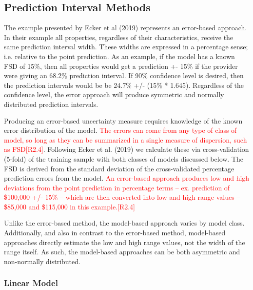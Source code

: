 \documentclass[colTwo]{anon}
\theoremstyle{definition}
\begin{document}
\subsection{Prediction Interval Methods}

The example presented by Ecker et al (2019) represents an error-based approach. In their example all properties, regardless of their characteristics, receive the same prediction interval width.  These widths are expressed in a percentage sense; i.e. relative to the point prediction. As an example,  if the model has a known FSD of 15\%, then all properties would get a prediction +- 15\% if the provider were giving an 68.2\% prediction interval.  If 90\% confidence level is desired, then the prediction intervals would be be 24.7\% +/- (15\% * 1.645).  Regardless of the confidence level, the error approach will produce symmetric and normally distributed prediction intervals. 

Producing an error-based uncertainty measure requires knowledge of the known error distribution of the model. \textcolor{red}{The errors can come from any type of class of model, so long as they can be summarized in a single measure of dispersion, such as FSD[R2.4]}. Following Ecker et al. (2019) we calculate these via cross-validation (5-fold) of the training sample with both classes of models discussed below. The FSD is derived from the standard deviation of the cross-validated percentage prediction errors from the model. \textcolor{red}{An error-based approach produces low and high deviations from the point prediction in percentage terms -- ex. prediction of \$100,000 +/- 15\% -- which are then converted into low and high range values -- \$85,000 and \$115,000 in this example.[R2.4]}  

Unlike the error-based method, the model-based approach varies by model class. Additionally, and also in contrast to the error-based method, model-based approaches directly estimate the low and high range values, not the width of the range itself. As such, the model-based approaches can be both asymmetric and non-normally distributed. 

\subsubsection{Linear Model}
\end{document}

